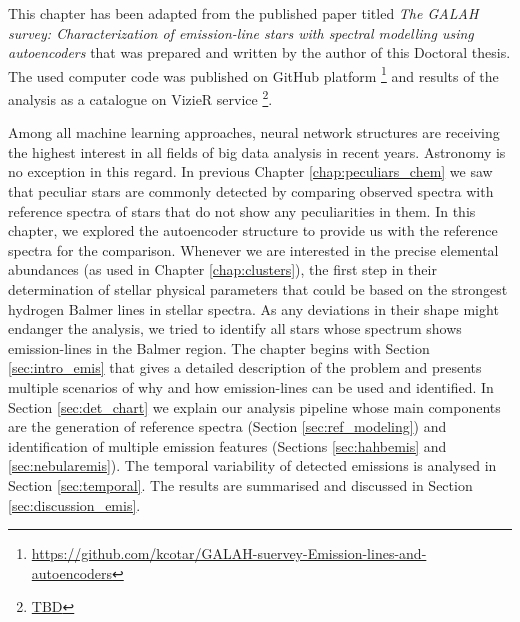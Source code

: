 This chapter has been adapted from the published paper titled \textit{The GALAH survey: Characterization of emission-line stars with spectral modelling using autoencoders} \cite{} that was prepared and written by the author of this Doctoral thesis. The used computer code was published on GitHub platform \footnote{\url{https://github.com/kcotar/GALAH-suervey-Emission-lines-and-autoencoders}} and results of the analysis as a catalogue on VizieR service \footnote{\url{TBD}}.

Among all machine learning approaches, neural network structures are receiving the highest interest in all fields of big data analysis in recent years. Astronomy is no exception in this regard. In previous Chapter \ref{chap:peculiars_chem} we saw that peculiar stars are commonly detected by comparing observed spectra with reference spectra of stars that do not show any peculiarities in them. In this chapter, we explored the autoencoder structure to provide us with the reference spectra for the comparison. Whenever we are interested in the precise elemental abundances (as used in Chapter \ref{chap:clusters}), the first step in their determination of stellar physical parameters that could be based on the strongest hydrogen Balmer lines in stellar spectra. As any deviations in their shape might endanger the analysis, we tried to identify all stars whose spectrum shows emission-lines in the Balmer region. The chapter begins with Section \ref{sec:intro_emis} that gives a detailed description of the problem and presents multiple scenarios of why and how emission-lines can be used and identified. In Section \ref{sec:det_chart} we explain our analysis pipeline whose main components are the generation of reference spectra (Section \ref{sec:ref_modeling}) and identification of multiple emission features (Sections \ref{sec:hahbemis} and \ref{sec:nebularemis}). The temporal variability of detected emissions is analysed in Section \ref{sec:temporal}. The results are summarised and discussed in Section \ref{sec:discussion_emis}.

